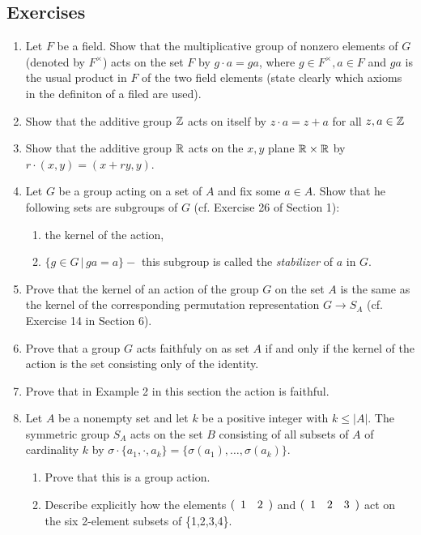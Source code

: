 \documentclass[10pt,a4paper]{report}
\begin{document}
\subsection{Exercises}

\begin{enumerate}
	\item Let $F$ be a field.  Show that the multiplicative group of nonzero elements of $G$ (denoted by $F^\times$) acts on the set $F$ by $g\cdot a=ga$, where $g \in F^\times,a \in F$ and $ga$ is the usual product in $F$ of the two field elements (state clearly which axioms in the definiton of a filed are used).
	
	\item Show that the additive group $\mathbb{Z}$ acts on itself by $z\cdot a=z+a$ for all $z,a \in \mathbb{Z}$
	
	\item Show that the additive group $\mathbb{R}$ acts on the $x,y$ plane $\mathbb{R} \times \mathbb{R}$ by $r\cdot(x,y)=(x+ry,y)$.
	
	\item Let $G$ be a group acting on a set of $A$ and fix some $a \in A$.  Show that he following sets are subgroups of $G$ (cf.  Exercise 26 of Section 1):
	\begin{enumerate}
		\item the kernel of the action,
		\item $\{g \in G\,|\, ga=a\} -$ this subgroup is called the \textit{stabilizer} of $a$ in $G$.
	\end{enumerate}
	
	\item Prove that the kernel of an action of the group $G$ on the set $A$ is the same as the kernel of the corresponding permutation representation $G \to S_A$ (cf.  Exercise 14 in Section 6).
	
	\item Prove that a group $G$ acts faithfuly on as set $A$ if and only if the kernel of the action is the set consisting only of the identity.
	
	\item Prove that in Example 2 in this section the action is faithful.
	
	\item Let $A$ be a nonempty set and let $k$ be a positive integer with $k \le |A|$.  The symmetric group $S_A$ acts on the set $B$ consisting of all subsets of $A$ of cardinality $k$ by $\sigma \cdot \{a_1,\cdot,a_k\} = \{\sigma(a_1), \dots, \sigma(a_k)\}$.
	\begin{enumerate}
		\item Prove that this is a group action.
		\item Describe explicitly how the elements $(\begin{array}{cccccccccc} 1&2 \end{array})$ and $(\begin{array}{cccccccccc} 1&2&3 \end{array})$ act on the six 2-element subsets of \{1,2,3,4\}.
	\end{enumerate}
	

\end{enumerate}
\end{document}
